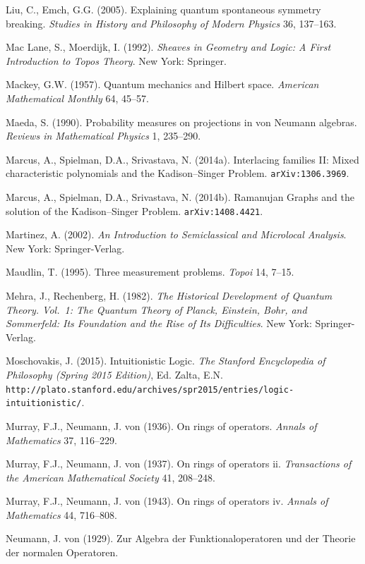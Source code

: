\documentclass[12pt]{article}
\begin{document}
\begin{footnotesize}
\begin{trivlist}
\item  Liu, C., Emch, G.G.  (2005). Explaining quantum spontaneous symmetry breaking.
\emph{Studies in History and Philosophy of Modern Physics}  36, 137--163. 
\item Mac Lane, S.,   Moerdijk, I. (1992). \emph{Sheaves in Geometry and Logic: A First Introduction to Topos Theory}.
New York: Springer. 
\item Mackey, G.W. (1957). Quantum mechanics and Hilbert space. \emph{ American Mathematical Monthly}
64, 45--57.
\item Maeda, S. (1990). Probability measures on projections in von Neumann algebras.
      \emph{Reviews in Mathematical Physics} 1, 235--290.
 \item  Marcus, A.,  Spielman, D.A.,  Srivastava, N. (2014a). Interlacing families II: Mixed characteristic polynomials and the Kadison--Singer Problem.  \texttt{arXiv:1306.3969}.
  \item  Marcus, A.,  Spielman, D.A.,  Srivastava, N. (2014b).
 Ramanujan Graphs and the solution of the Kadison--Singer Problem.  \texttt{arXiv:1408.4421}.
 \item Martinez, A. (2002). \emph{An Introduction to Semiclassical and Microlocal Analysis}. New York: Springer-Verlag. 
 \item Maudlin, T. (1995). Three measurement problems. \emph{Topoi} 14, 7--15. 
\item  Mehra, J.,  Rechenberg, H. (1982). \emph{The Historical Development of Quantum Theory. Vol.\ 1: The Quantum Theory of Planck, Einstein, Bohr, and Sommerfeld: Its Foundation and the Rise of Its Difficulties}. New York: Springer-Verlag.
\item Moschovakis, J. (2015). Intuitionistic Logic. \emph{The Stanford Encyclopedia of Philosophy (Spring 2015 Edition)}, 
Ed.  Zalta, E.N.  \verb#http://plato.stanford.edu/archives/spr2015/entries/logic-intuitionistic/#.
\item Murray, F.J., Neumann, J. von (1936).  On rings of operators. \emph{Annals of Mathematics}
37, 116--229.
\item Murray, F.J., Neumann, J. von (1937).  On rings of operators {\sc ii}.  \emph{Transactions of the American Mathematical Society} 41, 208--248. 
\item Murray, F.J., Neumann, J. von (1943).  On rings of operators {\sc iv}.
 \emph{Annals of Mathematics} 44, 716--808.
  \item Neumann, J. von (1929). Zur Algebra der Funktionaloperatoren und der Theorie der normalen Operatoren.

\end{trivlist}
\end{footnotesize}
\end{document}
